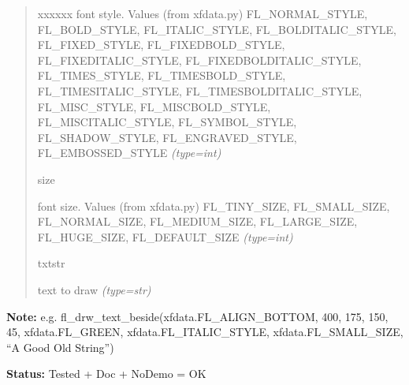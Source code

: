\begin{boxedminipage}{\funcwidth}
\begin{quote}
\begin{Ventry}{xxxxxx}
font style. Values (from xfdata.py) FL\_NORMAL\_STYLE, FL\_BOLD\_STYLE,
FL\_ITALIC\_STYLE, FL\_BOLDITALIC\_STYLE, FL\_FIXED\_STYLE,
FL\_FIXEDBOLD\_STYLE, FL\_FIXEDITALIC\_STYLE, FL\_FIXEDBOLDITALIC\_STYLE,
FL\_TIMES\_STYLE, FL\_TIMESBOLD\_STYLE, FL\_TIMESITALIC\_STYLE,
FL\_TIMESBOLDITALIC\_STYLE, FL\_MISC\_STYLE, FL\_MISCBOLD\_STYLE,
FL\_MISCITALIC\_STYLE, FL\_SYMBOL\_STYLE, FL\_SHADOW\_STYLE,
FL\_ENGRAVED\_STYLE, FL\_EMBOSSED\_STYLE
            {\it (type=int)}

          \item[size]


font size. Values (from xfdata.py) FL\_TINY\_SIZE, FL\_SMALL\_SIZE,
FL\_NORMAL\_SIZE, FL\_MEDIUM\_SIZE, FL\_LARGE\_SIZE, FL\_HUGE\_SIZE,
FL\_DEFAULT\_SIZE
            {\it (type=int)}

          \item[txtstr]


text to draw
            {\it (type=str)}

        \end{Ventry}

      \end{quote}

\textbf{Note:} 
e.g. fl\_drw\_text\_beside(xfdata.FL\_ALIGN\_BOTTOM, 400, 175, 150, 45,
xfdata.FL\_GREEN, xfdata.FL\_ITALIC\_STYLE, xfdata.FL\_SMALL\_SIZE,
``A Good Old String'')


\textbf{Status:} 
Tested + Doc + NoDemo = OK


    \end{boxedminipage}

    \label{xformslib:flbasic:fl_drw_text_cursor}

    \vspace{0.5ex}

